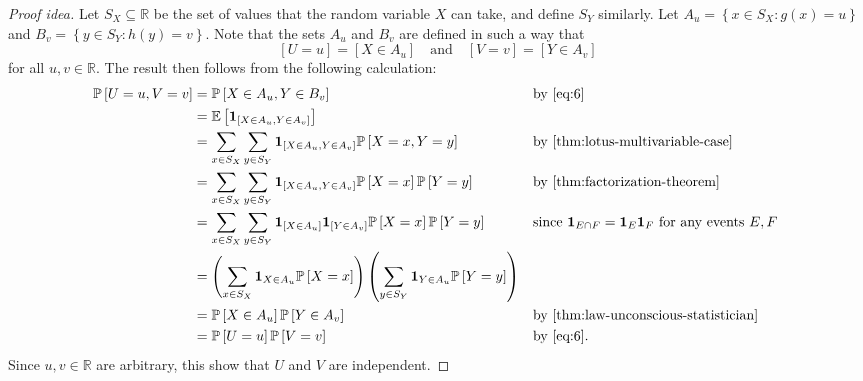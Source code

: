 \documentclass[10pt]{article}
\theoremstyle{definition}
\newcommand{\1}[1]{\textbf{1}_{\left[#1\right]}} %
\def\R{\mathbb{R}} %
\def\E{\mathbb{E}} %
\def\P{\mathbb{P}} %
\begin{document}
\begin{proof}[Proof idea]
  Let $S_{X}\subseteq \R$ be the set of values that the random variable $X$
  can take, and define $S_{Y}$ similarly. Let
  $A_{u}= \left\{x\in S_{X}: g(x) = u\right\}$ and
  $B_{v} = \left\{y\in S_{Y}: h(y) =v \right\}$. Note that the sets $A_{u}$
  and $B_{v}$ are defined in such a way that
  \begin{equation}\label{eq:6}
    \left[ U=u \right] = \left[ X\in A_{u} \right]
    \quad \text{and} \quad
    \left[ V=v  \right] = \left[ Y\in A_{v} \right]    
  \end{equation}
  for all $u,v\in \R$. The result then follows from the following calculation:
  \begin{align*}
    \P\left[U = u, V = v\right]
    &= \P\left[X\in A_{u}, Y\in B_{v} \right] &&\text{by \cref{eq:6} }\\
    &= \E\left[\mathbf{1}_{\left[ X\in A_{u} , Y\in A_{v} \right] } \right]\\
    &= \sum_{x\in S_{X}} \sum_{y\in S_{Y}} \mathbf{1}_{\left[ X\in A_{u} ,
      Y\in A_{v}  \right] }  \P\left[X=x ,Y=y \right] &&\text{by \cref{thm:lotus-multivariable-case} }\\
    &= \sum_{x\in S_{X}} \sum_{y\in S_{Y}} \mathbf{1}_{\left[ X\in A_{u} ,
       Y\in A_{v}  \right] }  \P\left[X=x\right]\P\left[Y=y \right] &&\text{by \cref{thm:factorization-theorem} }\\
    &= \sum_{x\in S_{X}} \sum_{y\in S_{Y}} \mathbf{1}_{\left[ X\in
      A_{u}\right]} \mathbf{1}_{\left[Y\in A_{v}  \right] }
      \P\left[X=x\right]\P\left[Y=y \right] &&\text{since $\mathbf{1}_{E\cap
                                               F}=\mathbf{1}_{E}\mathbf{1}_{F}$
                                               for any events $E,F$ }\\
    &= \left( \sum_{x\in S_{X}}\mathbf{1}_{X\in A_{u}}\P\left[X=x \right] \right)
      \left( \sum_{y\in S_{Y}}\mathbf{1}_{Y\in A_{u}}\P\left[Y=y \right] \right)\\ 
    &= \P\left[X\in A_{u} \right] \P\left[Y\in A_{v} \right] &&\text{by \cref{thm:law-unconscious-statistician} }\\
    &= \P\left[U=u \right] \P\left[V=v \right] &&\text{by \cref{eq:6}.}
  \end{align*}
  Since $u,v\in \R$ are arbitrary, this show that $U$ and $V$ are independent.
\end{proof}
\end{document}
